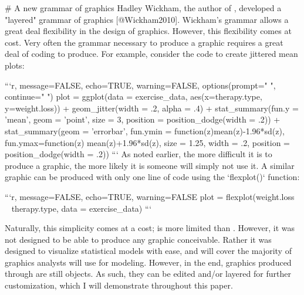 # A new grammar of graphics
Hadley Wickham, the author of , developed a "layered" grammar of graphics [@Wickham2010]. Wickham's grammar allows a great deal flexibility in the design of graphics. However, this flexibility comes at cost. Very often the grammar necessary to produce a graphic requires a great deal of coding to produce. For example, consider the code to create jittered mean plots:


```{r, message=FALSE, echo=TRUE, warning=FALSE, options(prompt=" ", continue=" ")}
plot = ggplot(data = exercise_data, aes(x=therapy.type, y=weight.loss)) +
  geom_jitter(width = .2, alpha = .4) +
  stat_summary(fun.y = 'mean', geom = 'point', 
        size = 3, position = position_dodge(width = .2)) +
  stat_summary(geom = 'errorbar', fun.ymin = function(z){mean(z)-1.96*sd(z)}, 
        fun.ymax=function(z) {mean(z)+1.96*sd(z)}, 
        size = 1.25, width = .2, position = position_dodge(width = .2)) 
```
As noted earlier, the more difficult it is to produce a graphic, the more likely it is someone will simply not use it. A similar graphic can be produced with only one line of code using the `flexplot()` function:

```{r, message=FALSE, echo=TRUE, warning=FALSE}
plot = flexplot(weight.loss ~ therapy.type, data = exercise_data)
```


Naturally, this simplicity comes at a cost;  is more limited than . However, it was not designed to be able to produce any graphic conceivable. Rather it was designed to visualize statistical models with ease, and will cover the majority of graphics analysts will use for modeling. However, in the end, graphics produced through  are still  objects. As such, they can be edited and/or layered for further customization, which I will demonstrate throughout this paper. 



